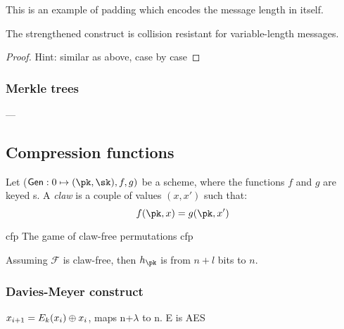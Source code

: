 This is an example of padding which encodes the message length in itself.

\begin{theorem}
    The strengthened construct is collision resistant for variable-length messages.
\end{theorem}

\begin{proof}
    Hint: similar as above, case by case
\end{proof}

\subsubsection{Merkle trees}

---

\subsection{Compression functions}

Let ($\textsf{Gen} : 0 \mapsto (\pk, \sk), f, g)$ be a \pke{} scheme, where the functions $f$ and $g$ are keyed \prp{}s. A \emph{claw} is a couple of values $(x, x')$ such that:
\[
    f(\pk, x) = g(\pk, x')
\]

\begin{cryptogame}
    {cfp}
    {The game of claw-free permutations}
    {cfp}
    

\end{cryptogame}

\begin{theorem}
    Assuming $\mathcal{F}$ is claw-free, then $h_\pk$ is \crh{} from $n + l$ bits to $n$.
\end{theorem}

\subsubsection{Davies-Meyer construct}

\begin{definition}
    $x_{i + 1} = E_k(x_i) \oplus x_i$, maps n+$\lambda$ to n. E is AES
\end{definition}
